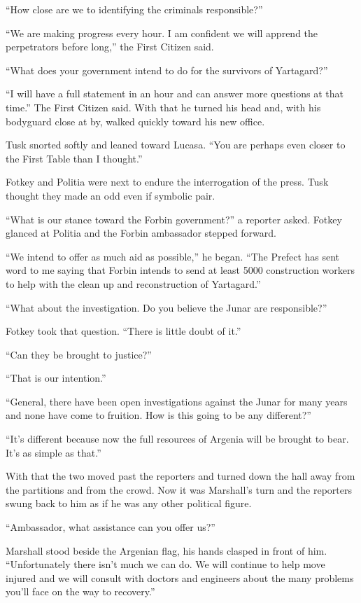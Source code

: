 ``How close are we to identifying the criminals responsible?''

``We are making progress every hour. I am confident we will apprend the perpetrators before
long,'' the First Citizen said.

``What does your government intend to do for the survivors of Yartagard?''

``I will have a full statement in an hour and can answer more questions at that time.'' The
First Citizen said. With that he turned his head and, with his bodyguard close at by, walked
quickly toward his new office.

Tusk snorted softly and leaned toward Lucasa. ``You are perhaps even closer to the First Table
than I thought.''

Fotkey and Politia were next to endure the interrogation of the press. Tusk thought they made an
odd even if symbolic pair.

``What is our stance toward the Forbin government?'' a reporter asked. Fotkey glanced at Politia
and the Forbin ambassador stepped forward.

``We intend to offer as much aid as possible,'' he began. ``The Prefect has sent word to me
saying that Forbin intends to send at least 5000 construction workers to help with the clean up
and reconstruction of Yartagard.''

``What about the investigation. Do you believe the Junar are responsible?''

Fotkey took that question. ``There is little doubt of it.''

``Can they be brought to justice?''

``That is our intention.''

``General, there have been open investigations against the Junar for many years and none have
come to fruition. How is this going to be any different?''

``It's different because now the full resources of Argenia will be brought to bear. It's as
simple as that.''

With that the two moved past the reporters and turned down the hall away from the partitions and
from the crowd. Now it was Marshall's turn and the reporters swung back to him as if he was any
other political figure.

``Ambassador, what assistance can you offer us?''

Marshall stood beside the Argenian flag, his hands clasped in front of him. ``Unfortunately
there isn't much we can do. We will continue to help move injured and we will consult with
doctors and engineers about the many problems you'll face on the way to recovery.''

